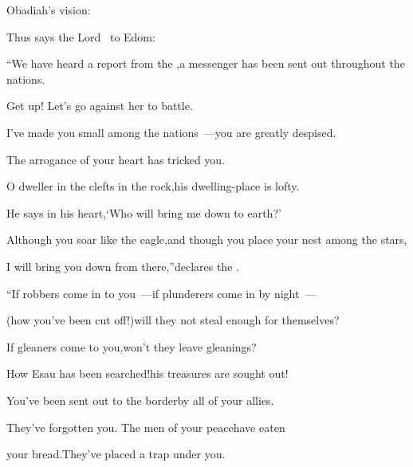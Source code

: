 
\begin{inparaenum}
  \hfil{} Obadiah's vision:\hfil%
  
  \smallskip
  \pa Thus says the Lord \god\ to Edom:%
  
  \pb ``We have heard%
  a report from the \lord,\pa a messenger has been sent out throughout the nations.%
  
  \pb Get up! Let's go against her to battle.%
  
  \pa {} I've made you small among the nations~---\pa you are greatly despised.%
  
  \pa {} The arrogance%
  of your heart has tricked you.%
  
  \pb O dweller in the clefts in the rock,\pa his dwelling-place is lofty.%
  
  \pb He says in his heart,\pa `Who will bring me down to earth?'%
  
  \pa {} Although you soar like the eagle,\pa and though you place your nest among the stars,%
  
  \pb I will bring you down from there,''\pa declares the \lord.%
  
  \pb {} ``If robbers come in to you~---\pa if plunderers come in by night~---%
  
  \pc (how you've been cut off!)\pa will they not steal enough for themselves?%
  
  \pc If gleaners come to you,\pa won't they leave gleanings?%
  
  \pb {} How Esau has been searched!\pa his treasures are sought out!%
  
  \pb {} You've been sent out to the border\pa by all of your allies.%
  
  \pc They've forgotten you. The men of your peace\pa have eaten%
  
  \pc your bread.\pa They've placed a trap%
  under you.%
  

\end{inparaenum}

